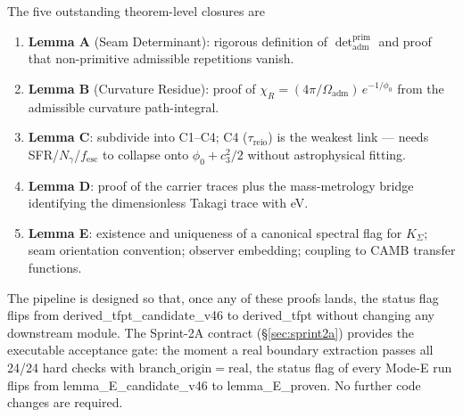 \documentclass[11pt,a4paper]{article}
\begin{document}
The five outstanding theorem-level closures are
\begin{enumerate}[leftmargin=1.4em]
\item \textbf{Lemma A} (Seam Determinant): rigorous definition of
\(\det_{\mathrm{adm}}^{\mathrm{prim}}\) and proof that
non-primitive admissible repetitions vanish.
\item \textbf{Lemma B} (Curvature Residue): proof of
\(\chi_R = (4\pi/\Omega_{\mathrm{adm}})\,e^{-1/\phi_0}\) from the
admissible curvature path-integral.
\item \textbf{Lemma C}: subdivide into C1--C4; C4 (\(\tau_{\mathrm{reio}}\))
is the weakest link --- needs SFR/\(N_\gamma\)/\(f_{\mathrm{esc}}\) to
collapse onto \(\phi_0+c_3^2/2\) without astrophysical fitting.
\item \textbf{Lemma D}: proof of the carrier traces plus the
mass-metrology bridge identifying the dimensionless Takagi trace with
eV.
\item \textbf{Lemma E}: existence and uniqueness of a canonical
spectral flag for \(K_\Sigma\); seam orientation convention; observer
embedding; coupling to CAMB transfer functions.
\end{enumerate}

The pipeline is designed so that, once any of these proofs lands, the
status flag flips from \textsf{derived\_tfpt\_candidate\_v46} to
\textsf{derived\_tfpt} without changing any downstream module.  The
Sprint-2A contract (\S\ref{sec:sprint2a}) provides the executable
acceptance gate: the moment a real boundary extraction passes all
24/24 hard checks with \(\mathrm{branch\_origin}=\mathrm{real}\), the
status flag of every Mode-E run flips from
\textsf{lemma\_E\_candidate\_v46} to
\textsf{lemma\_E\_proven}.  No further code changes are required.
\end{document}
